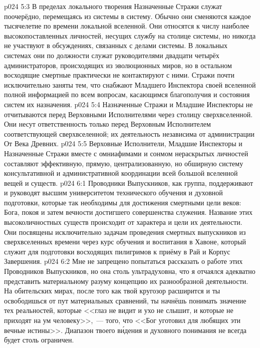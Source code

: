 \vs p024 5:3 В пределах локального творения Назначенные Стражи служат поочерёдно, перемещаясь из системы в систему. Обычно они сменяются каждое тысячелетие по времени локальной вселенной. Они относятся к числу наиболее высокопоставленных личностей, несущих службу на столице системы, но никогда не участвуют в обсуждениях, связанных с делами системы. В локальных системах они по должности служат руководителями двадцати четырёх администраторов, происходящих из эволюционных миров, но в остальном восходящие смертные практически не контактируют с ними. Стражи почти исключительно заняты тем, что снабжают Младшего Инспектора своей вселенной полной информацией по всем вопросам, касающимся благополучия и состояния систем их назначения.
\vs p024 5:4 Назначенные Стражи и Младшие Инспекторы не отчитываются перед Верховными Исполнителями через столицу сверхвселенной. Они несут ответственность только перед Верховным Исполнителем соответствующей сверхвселенной; их деятельность независима от администрации От Века Древних.
\vs p024 5:5 \pc Верховные Исполнители, Младшие Инспекторы и Назначенные Стражи вместе с омниафимами и сонмом нераскрытых личностей составляют эффективную, прямую, централизованную, но обширную систему консультативной и административной координации всей большой вселенной вещей и существ.
\vs p024 6:1 Проводники Выпускников, как группа, поддерживают и руководят высшим университетом технического обучения и духовной подготовки, которые так необходимы для достижения смертными цели веков: Бога, покоя и затем вечности достигшего совершенства служения. Название этих высоколичностных существ происходит от характера и цели их деятельности. Они посвящены исключительно задачам проведения смертных выпускников из сверхвселенных времени через курс обучения и воспитания в Хавоне, который служит для подготовки восходящих пилигримов к приёму в Рай и Корпус Завершения.
\vs p024 6:2 Мне не запрещено попытаться рассказать о работе этих Проводников Выпускников, но она столь ультрадуховна, что я отчаялся адекватно представить материальному разуму концепцию их разнообразной деятельности. На обительских мирах, после того как твой кругозор расширится и ты освободишься от пут материальных сравнений, ты начнёшь понимать значение тех реальностей, которые <<глаз не видит и ухо не слышит, и которые не приходят на ум человеку>>,~--- того, что <<Бог уготовил для любящих эти вечные истины>>. Диапазон твоего в\'идения и духовного понимания не всегда будет столь ограничен.
